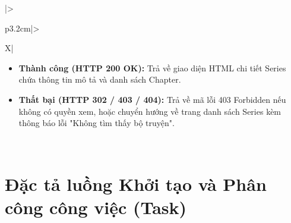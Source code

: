 \begin{table}[H]
\begin{tabularx}{\textwidth}{|>{\raggedright\arraybackslash\bfseries}p{3.2cm}|>{\raggedright\arraybackslash}X|}
\begin{minipage}[t]{\linewidth}
\begin{itemize}[leftmargin=*]
        \item \textbf{Thành công (HTTP 200 OK):} Trả về giao diện HTML chi tiết Series chứa thông tin mô tả và danh sách Chapter.
        \item \textbf{Thất bại (HTTP 302 / 403 / 404):} Trả về mã lỗi 403 Forbidden nếu không có quyền xem, hoặc chuyển hướng về trang danh sách Series kèm thông báo lỗi "Không tìm thấy bộ truyện".
    \end{itemize}
\end{minipage} \\ \hline
\end{tabularx}
\caption{Đặc tả yêu cầu xem chi tiết Series}
\label{tab:api_series_show}
\end{table}

\newpage

\section{Đặc tả luồng Khởi tạo và Phân công công việc (Task)}
\label{sec:api_task_store}


